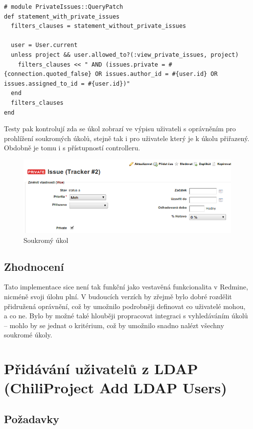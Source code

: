 \documentclass[thesis=B,czech]{FITthesis}[2012/05/02]
\begin{document}
\begin{lstlisting}
# module PrivateIssues::QueryPatch
def statement_with_private_issues
  filters_clauses = statement_without_private_issues

  user = User.current
  unless project && user.allowed_to?(:view_private_issues, project)
    filters_clauses << " AND (issues.private = #{connection.quoted_false} OR issues.author_id = #{user.id} OR issues.assigned_to_id = #{user.id})"
  end
  filters_clauses
end
\end{lstlisting}
Testy pak kontrolují zda se úkol zobrazí ve výpisu uživateli s
oprávněním pro prohlížení soukromých úkolů, stejně tak i pro uživatele
který je k úkolu přiřazený. Obdobně je tomu i s přístupností
controlleru.

\begin{figure}[tbp]
\centering
\centerline{\includegraphics[width=1.2\textwidth]{issues-gui1.png}}
\caption{Soukromý úkol}
\end{figure}

\subsection{Zhodnocení}

Tato implementace sice není tak funkční jako vestavěná funkcionalita v
Redmine, nicméně svoji úlohu plní. V budoucích verzích by zřejmě bylo
dobré rozdělit přidružená oprávnění, což by umožnilo podrobněji
definovat co uživatelé mohou, a co ne. Bylo by možné také hlouběji
propracovat integraci s vyhledáváním úkolů -- mohlo by se jednat o
kritérium, což by umožnilo snadno nalézt všechny soukromé úkoly.

\section{Přidávání uživatelů z LDAP (ChiliProject Add LDAP Users)}
\label{sec:add_ldap_users}

\subsection{Požadavky}
\end{document}
